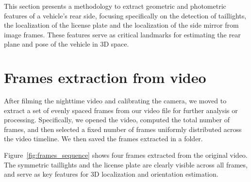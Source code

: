 This section presents a methodology to extract geometric and photometric features of a vehicle's rear side, focusing specifically on the detection of taillights, the localization of the license plate and the localization of the side mirror from image frames. These features serve as critical landmarks for estimating the rear plane and pose of the vehicle in 3D space.

\section{Frames extraction from video}
After filming the nighttime video and calibrating the camera, we moved to extract a set of evenly spaced frames from our video file for further analysis or processing. Specifically, we opened the video, computed the total number of frames, and then selected a fixed number of frames uniformly distributed across the video timeline. We then saved the frames extracted in a folder.

Figure~\ref{fig:frames_sequence} shows four frames extracted from the original video. The symmetric taillights and the license plate are clearly visible across all frames, and serve as key features for 3D localization and orientation estimation.


